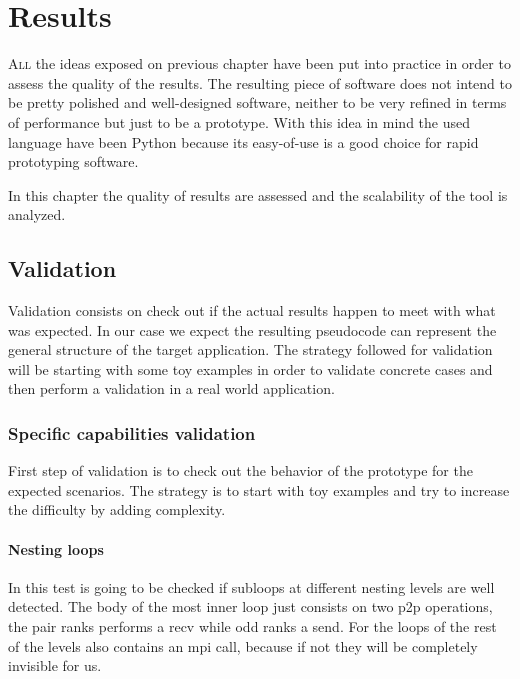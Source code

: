 \chapter{Results}

\lettrine{A}{ll} the ideas exposed on previous chapter have been put into 
practice in order
to assess the quality of the results. The resulting piece of
software does not intend to be pretty polished and well-designed software,
neither to be very refined in terms of performance but just to be a prototype.
With this idea in mind the used language have been Python because its
easy-of-use is a good choice for rapid prototyping software.

In this chapter the quality of results are assessed and the scalability
of the tool is analyzed.

\section{Validation}\label{s:validation}

Validation consists on check out if the actual results happen to meet with what
was expected. In our case we expect the resulting pseudocode can represent the
general structure of the target application. The strategy followed for
validation will be starting with some toy examples in order to validate concrete
cases and then perform a validation in a real world application.

\subsection{Specific capabilities validation}

First step of validation is to check out the behavior of the prototype for 
the expected scenarios. The strategy is to start with toy examples and try to
increase the difficulty by adding complexity.

\subsubsection{Nesting loops}

In this test is going to be checked if subloops at different nesting levels are
well detected. The body of the most inner loop just consists on two p2p operations, the
pair ranks performs a recv while odd ranks a send. For the loops of the rest of
the levels also contains an mpi call, because if not they will be completely
invisible for us. 

